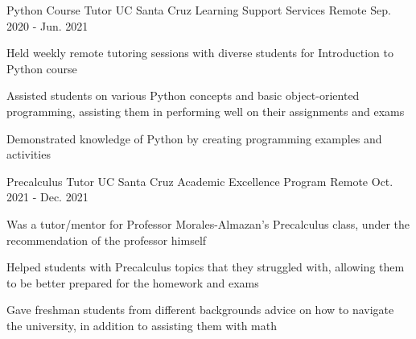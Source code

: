

\begin{cventries}

  \cventry
    {Python Course Tutor} %
    {UC Santa Cruz Learning Support Services} %
    {Remote} %
    {Sep. 2020 - Jun. 2021} %
    {
      \begin{cvitems} %
        \item{Held weekly remote tutoring sessions with diverse students for Introduction to Python course}
        \item{Assisted students on various Python concepts and basic object-oriented programming, assisting
        them in performing well on their assignments and exams}
        \item{Demonstrated knowledge of Python by creating programming examples and activities}
      \end{cvitems}
    }

    \cventry
    {Precalculus Tutor} %
    {UC Santa Cruz Academic Excellence Program} %
    {Remote} %
    {Oct. 2021 - Dec. 2021} %
    {
      \begin{cvitems} %
        \item{Was a tutor/mentor for Professor Morales-Almazan's Precalculus class, under the
              recommendation of the professor himself}
        \item{Helped students with Precalculus topics that they struggled with, allowing them to be better
              prepared for the homework and exams}
        \item{Gave freshman students from different backgrounds advice on how to navigate the university, in
              addition to assisting them with math}
      \end{cvitems}
    }
\end{cventries}
